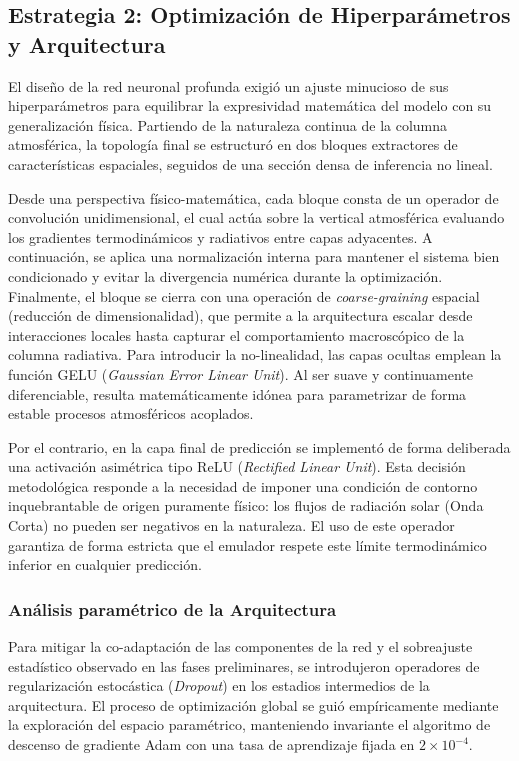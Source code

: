 \documentclass[11pt,a4paper,twoside,pdf]{article}
\numberwithin{equation}{section}
\begin{document}
\subsection{Estrategia 2: Optimización de Hiperparámetros y Arquitectura}

El diseño de la red neuronal profunda exigió un ajuste minucioso de sus hiperparámetros para equilibrar la expresividad matemática del modelo con su generalización física. Partiendo de la naturaleza continua de la columna atmosférica, la topología final se estructuró en dos bloques extractores de características espaciales, seguidos de una sección densa de inferencia no lineal.

Desde una perspectiva físico-matemática, cada bloque consta de un operador de convolución unidimensional, el cual actúa sobre la vertical atmosférica evaluando los gradientes termodinámicos y radiativos entre capas adyacentes. A continuación, se aplica una normalización interna para mantener el sistema bien condicionado y evitar la divergencia numérica durante la optimización. Finalmente, el bloque se cierra con una operación de \textit{coarse-graining} espacial (reducción de dimensionalidad), que permite a la arquitectura escalar desde interacciones locales hasta capturar el comportamiento macroscópico de la columna radiativa. Para introducir la no-linealidad, las capas ocultas emplean la función GELU (\textit{Gaussian Error Linear Unit}). Al ser suave y continuamente diferenciable, resulta matemáticamente idónea para parametrizar de forma estable procesos atmosféricos acoplados.

Por el contrario, en la capa final de predicción se implementó de forma deliberada una activación asimétrica tipo ReLU (\textit{Rectified Linear Unit}). Esta decisión metodológica responde a la necesidad de imponer una condición de contorno inquebrantable de origen puramente físico: los flujos de radiación solar (Onda Corta) no pueden ser negativos en la naturaleza. El uso de este operador garantiza de forma estricta que el emulador respete este límite termodinámico inferior en cualquier predicción.

\subsubsection{Análisis paramétrico de la Arquitectura}

Para mitigar la co-adaptación de las componentes de la red y el sobreajuste estadístico observado en las fases preliminares, se introdujeron operadores de regularización estocástica (\textit{Dropout}) en los estadios intermedios de la arquitectura. El proceso de optimización global se guió empíricamente mediante la exploración del espacio paramétrico, manteniendo invariante el algoritmo de descenso de gradiente Adam con una tasa de aprendizaje fijada en $2 \times 10^{-4}$. 
\end{document}
